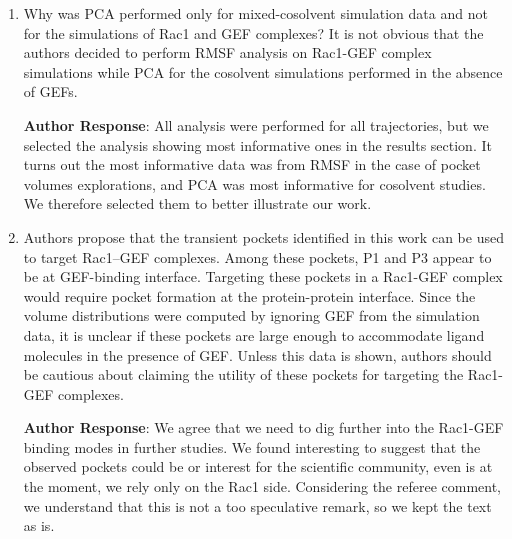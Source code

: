 \documentclass[11pt, a4paper]{article}
\begin{document}
\begin{enumerate}
    \item Why was PCA performed only for mixed-cosolvent simulation data and not for the simulations of Rac1 and GEF complexes? It is not obvious that the authors decided to perform RMSF analysis on Rac1-GEF complex simulations while PCA for the cosolvent simulations performed in the absence of GEFs.

\textbf{Author Response}: All analysis were performed for all trajectories, but we selected the analysis showing most informative ones in the results section. It turns out the most informative data was from RMSF in the case of pocket volumes explorations, and PCA was most informative for cosolvent studies. We therefore selected them to better illustrate our work. 

    \item Authors propose that the transient pockets identified in this work can be used to target Rac1–GEF complexes. Among these pockets, P1 and P3 appear to be at GEF-binding interface. Targeting these pockets in a Rac1-GEF complex would require pocket formation at the protein-protein interface. Since the volume distributions were computed by ignoring GEF from the simulation data, it is unclear if these pockets are large enough to accommodate ligand molecules in the presence of GEF. Unless this data is shown, authors should be cautious about claiming the utility of these pockets for targeting the Rac1-GEF complexes.

\textbf{Author Response}: We agree that we need to dig further into the Rac1-GEF binding modes in further studies. We found interesting to suggest that the observed pockets could be or interest for the scientific community, even is at the moment, we rely only on the Rac1 side. Considering the referee comment, we understand that this is not a too speculative remark, so we kept the text as is.
    
\end{enumerate}
\end{document}
